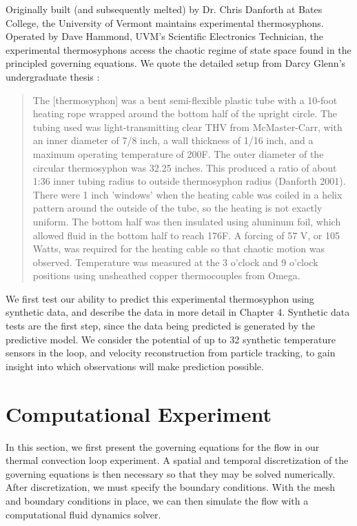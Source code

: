 \documentclass[12pt]{report}
\begin{document}
Originally built (and subsequently melted) by Dr. Chris Danforth at Bates College, the University of Vermont maintains experimental thermosyphons.
Operated by Dave Hammond, UVM's Scientific Electronics Technician, the experimental thermosyphons access the chaotic regime of state space found in the principled governing equations.
We quote the detailed setup from Darcy Glenn's undergraduate thesis :
\begin{quote}
The [thermosyphon] was a bent semi-flexible plastic tube with a 10-foot heating rope wrapped around the bottom half of the upright circle.
The tubing used was light-transmitting clear THV from McMaster-Carr, with an inner diameter of 7/8 inch, a wall thickness of 1/16 inch, and a maximum operating temperature of 200F.
The outer diameter of the circular thermosyphon was 32.25 inches.
This produced a ratio of about 1:36 inner tubing radius to outside thermosyphon radius (Danforth 2001).
There were 1 inch 'windows' when the heating cable was coiled in a helix pattern around the outside of the tube, so the heating is not exactly uniform.
The bottom half was then insulated using aluminum foil, which allowed fluid in the bottom half to reach 176F.
A forcing of 57 V, or 105 Watts, was required for the heating cable so that chaotic motion was observed.
Temperature was measured at the 3 o'clock and 9 o'clock positions using unsheathed copper thermocouples from Omega.
\end{quote}

We first test our ability to predict this experimental thermosyphon using synthetic data, and describe the data in more detail in Chapter 4.
Synthetic data tests are the first step, since the data being predicted is generated by the predictive model.
We consider the potential of up to 32 synthetic temperature sensors in the loop, and velocity reconstruction from particle tracking, to gain insight into which observations will make prediction possible.

\section{Computational Experiment}
In this section, we first present the governing equations for the flow in our thermal convection loop experiment.
A spatial and temporal discretization of the governing equations is then necessary so that they may be solved numerically.
After discretization, we must specify the boundary conditions.
With the mesh and boundary conditions in place, we can then simulate the flow with a computational fluid dynamics solver.
\end{document}

